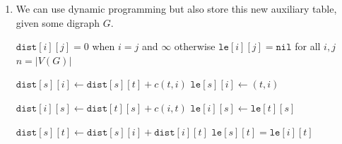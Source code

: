 \documentclass[12pt]{article}
\begin{document}
\begin{enumerate}
    On iteration $0,$ all vertices with shortest path with $0$ edges
    from $s$ (i.e., only $s$) have their distance correctly set (to
    $0$). Hence, at iteration $j,$ the $\texttt{dist}$ map is correct
    up to vertices with shortest path at most $j$ length, for all $j \geq 0.$

    Since we terminate the loop when our relaxation never changes
    edge weights, we terminate at iteration $i,$ where $i$ is the
    smallest edge length such that there are no shortest paths from
    $s$ to any vertex $v$ of length $i.$ Thus, $i \leq k + 1,$
    meaning we have $\mathcal O(k)$ iterations.

    Thus, the algorithm is correct and runs in $\mathcal O(k |E|)$ time.

    \newpage

  \item We can use dynamic programming but also store this new
    auxiliary table, given some digraph $G.$

    \begin{algorithm}
      \caption{Modified Floyd Warshall}
      \begin{algorithmic}
        \State $\texttt{dist}[i][j] = 0$ when $i = j$ and $\infty$ otherwise
        \State $\texttt{le}[i][j] = \texttt{nil}$ for all $i, j$
        \State $n = |V(G)|$

        \vspace{3mm}

        \State $\texttt{dist}[s][i] \gets \texttt{dist}[s][t] + c(t, i)$
        \State $\texttt{le}[s][i] \gets (t, i)$
        \EndIf

        \vspace{3mm}

        \State $\texttt{dist}[i][s] \gets \texttt{dist}[t][s] + c(i, t)$
        \State $\texttt{le}[i][s] \gets \texttt{le}[t][s]$
        \EndIf
        \EndFor

        \vspace{3mm}
        \EndFor

        \vspace{3mm}

        \State $\texttt{dist}[s][t] \gets \texttt{dist}[s][i] +
        \texttt{dist}[i][t]$
        \State $\texttt{le}[s][t] = \texttt{le}[i][t]$
        \EndIf
        \EndFor
        \EndFor
        \EndFor


\end{algorithmic}
\end{algorithm}
\end{enumerate}
\end{document}
